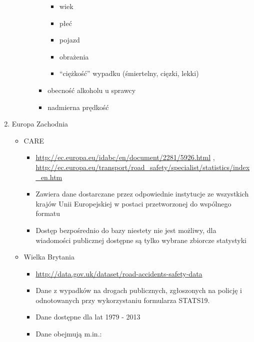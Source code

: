 \begin{enumerate}
\begin{itemize}
\begin{itemize}
\begin{itemize}
        \begin{itemize}
        \itemsep-14pt\parskip0pt
        \item
          wiek\\
        \item
          płeć\\
        \item
          pojazd\\
        \item
          obrażenia\\
        \item
          ``ciężkość'' wypadku (śmiertelny, cięzki, lekki)\\
        \end{itemize}
      \item
        obecność alkoholu u sprawcy\\
      \item
        nadmierna prędkość\\
      \end{itemize}
    \end{itemize}
  \end{itemize}
\item
  Europa Zachodnia

  \begin{itemize}
  \item
    CARE

    \begin{itemize}
    \itemsep-14pt\parskip0pt
    \item
      \url{http://ec.europa.eu/idabc/en/document/2281/5926.html} ,
      \url{http://ec.europa.eu/transport/road_safety/specialist/statistics/index_en.htm}\\
    \item
      Zawiera dane dostarczane przez odpowiednie instytucje ze
      wszystkich krajów Unii Europejskiej w postaci przetworzonej do
      wspólnego formatu\\
    \item
      Dostęp bezpośrednio do bazy niestety nie jest możliwy, dla
      wiadomości publicznej dostępne są tylko wybrane zbiorcze
      statystyki\\
    \end{itemize}
  \item
    Wielka Brytania

    \begin{itemize}
    \item
      \url{http://data.gov.uk/dataset/road-accidents-safety-data}\\
    \item
      Dane z wypadków na drogach publicznych, zgłoszonych na policję i
      odnotowanych przy wykorzystaniu formularza STATS19.\\
    \item
      Dane dostępne dla lat 1979 - 2013\\
    \item
      Dane obejmują m.in.:


\end{itemize}
\end{itemize}
\end{enumerate}
